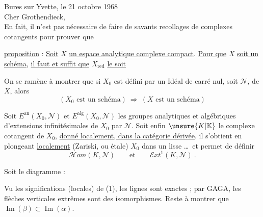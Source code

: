 \reversemarginpar{}\normalmarginpar
\noindent\hfill Bures sur Yvette, le 21 octobre 1968\\

\noindent Cher Grothendieck,\\

En fait, il n'est pas nécessaire de faire de savants recollages de complexes cotangents pour prouver que

\noindent \uline{proposition} : \uline{Soit} \(X\) \uline{un espace analytique complexe compact}. \uline{Pour que} \(X\) \uline{soit un schéma}, \uline{il faut et suffit que} \(X_{\mathrm{red}}\) \uline{le soit}

On se ramène à  montrer que si \(X_0\) est défini par un Idéal de carré nul, soit \(\mathscr{N}\), de \(X\), alors
\[
 (X_0\text{ est un schéma})\ \Longrightarrow\ (X\text{ est un schéma})
\]

Soit \(E^{\mathrm{an}}(X_0,\mathscr{N})\) et \(E^{\mathrm{alg}}(X_0,\mathscr{N})\) les groupes analytiques et algébriques d'extensions infinitésimales de \(X_0\) par \(\mathscr{N}\). Soit enfin \(\unsure{K|\mathbb{K}}\) le complexe cotangent de \(X_0\), \uline{donné localement, dans la catégorie dérivée}. il s'obtient en plongeant \uline{localement} (Zariski, ou étale) \(X_0\) dans un  lisse \ldots\ et permet de définir
\begingroup
\makeatletter\tagsleft@true\makeatother
\[
 \mathscr{H}om(K,\mathscr{N})\qquad\text{et}\qquad\mathscr{E}xt^{1}(K,\mathscr{N})\ .\tag*{(1)}
\]
\endgroup

Soit le diagramme :

\margin{\unsure{:}}

Vu les significations (locales) de (1), les lignes sont exactes ; par GAGA, les flèches verticales extrêmes sont des isomorphismes. Reste à  montrer que \(\operatorname{Im}(\beta)\subset\operatorname{Im}(\alpha)\).
\clearpage
